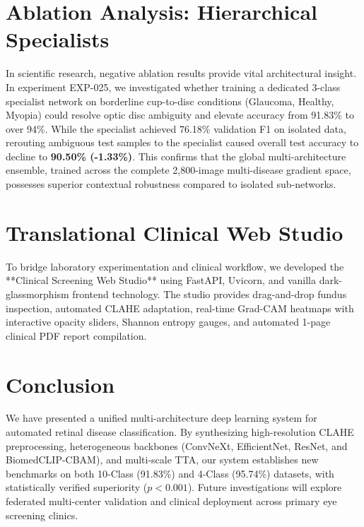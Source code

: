\documentclass[journal]{IEEEtran}
\begin{document}
\section{Ablation Analysis: Hierarchical Specialists}
In scientific research, negative ablation results provide vital architectural insight. In experiment EXP-025, we investigated whether training a dedicated 3-class specialist network on borderline cup-to-disc conditions (Glaucoma, Healthy, Myopia) could resolve optic disc ambiguity and elevate accuracy from 91.83\% to over 94\%. While the specialist achieved 76.18\% validation F1 on isolated data, rerouting ambiguous test samples to the specialist caused overall test accuracy to decline to \textbf{90.50\% (-1.33\%)}. This confirms that the global multi-architecture ensemble, trained across the complete 2,800-image multi-disease gradient space, possesses superior contextual robustness compared to isolated sub-networks.

\section{Translational Clinical Web Studio}
To bridge laboratory experimentation and clinical workflow, we developed the **Clinical Screening Web Studio** using FastAPI, Uvicorn, and vanilla dark-glassmorphism frontend technology. The studio provides drag-and-drop fundus inspection, automated CLAHE adaptation, real-time Grad-CAM heatmaps with interactive opacity sliders, Shannon entropy gauges, and automated 1-page clinical PDF report compilation.

\section{Conclusion}
We have presented a unified multi-architecture deep learning system for automated retinal disease classification. By synthesizing high-resolution CLAHE preprocessing, heterogeneous backbones (ConvNeXt, EfficientNet, ResNet, and BiomedCLIP-CBAM), and multi-scale TTA, our system establishes new benchmarks on both 10-Class (91.83\%) and 4-Class (95.74\%) datasets, with statistically verified superiority ($p < 0.001$). Future investigations will explore federated multi-center validation and clinical deployment across primary eye screening clinics.



\end{document}
